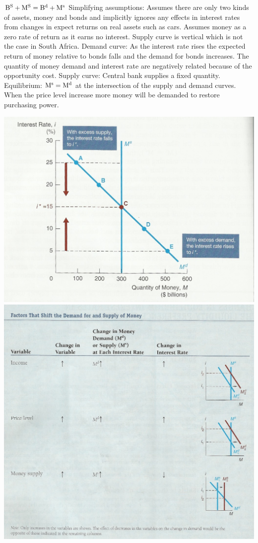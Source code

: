 \documentclass[12pt]{examnotes}
\begin{document}
$\rm{B^S+M^S=B^d+M^s}$
Simplifying assumptions: Assumes there are only two kinds of assets, money and bonds and implicitly ignores any effects in interest rates from changes in expect returns on real assets such as cars. Assumes money as a zero rate of return as it earns no interest. Supply curve is vertical which is not the case in South Africa.
Demand curve: As the interest rate rises the expected return of money relative to bonds falls and the demand for bonds increases. The quantity of money demand and interest rate are negatively related because of the opportunity cost.
Supply curve: Central bank supplies a fixed quantity.
Equilibrium: $\rm{M^s=M^d}$ at the intersection of the supply and demand curves.
When the price level increase more money will be demanded to restore purchasing power.
\begin{center}
  \includegraphics[scale=0.4]{./imgs/c5fig8}
  \includegraphics[scale=0.4]{./imgs/c5ft4.jpg}
\end{center}
\end{document}
